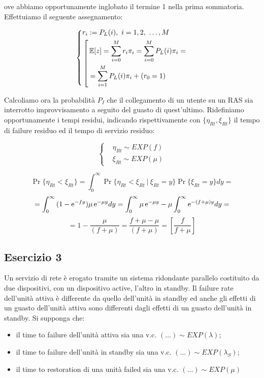 ove abbiamo opportunamente inglobato il termine 1 nella prima sommatoria. Effettuiamo il seguente assegnamento:

\[
	\left\{
	\begin{aligned}
	&r_i := P_L(i),\ i=1,2,\ \dots,M\\
	&\left[
	\begin{aligned}
	&\operatorname{\mathbb{E}}[z] = \sum_{i=0}^M{r_i\pi_i} = \sum_{i=0}^M{P_L(i)\pi_i} =\\
	&= \sum_{i=1}^M{P_L(i)\pi_i} + (r_0=1)
	\end{aligned}
	\right.
	\end{aligned}
	\right.
\]

Calcoliamo ora la probabilità $P_I$ che il collegamento di un utente su un RAS sia interrotto improvvisamento a seguito del guasto di quest'ultimo. Ridefiniamo opportunamente i tempi residui, indicando rispettivamente con $\{\eta_{Rt},\xi_{Rt}\}$ il tempo di failure residuo ed il tempo di servizio residuo:

\[
	\left\{
	\begin{aligned}
	&\eta_{Rt}\sim EXP(f)\\
	&\xi_{Rt}\sim EXP(\mu)
	\end{aligned}
	\right.
\]

\[
	\Pr\{\eta_{Rt}<\xi_{Rt}\} = \int_0^\infty{\Pr\{\eta_{Rt}<\xi_{Rt}\ |\ \xi_{Rt}=y\}\Pr\{\xi_{Rt}=y\}dy} =
\]
\[
	= \int_0^\infty{(1-\mathop{}\!\mathrm{e}^{-fy})\mu\mathop{}\!\mathrm{e}^{-\mu y}dy} = \int_0^\infty{\mu\mathop{}\!\mathrm{e}^{-\mu y}}-\mu\int_0^\infty{\mathop{}\!\mathrm{e}^{-(f+\mu)y}dy} =
\]
\[
	= 1-\frac{\mu}{(f+\mu)} = \frac{f+\mu-\mu}{(f+\mu)} = [\frac{f}{f+\mu}]
\]
	

\subsection{Esercizio 3}

Un servizio di rete è erogato tramite un sistema ridondante parallelo costituito da due dispositivi, con un dispositivo active, l’altro in standby. Il failure rate dell’unità attiva è differente da quello dell’unità in standby ed anche gli effetti di un guasto dell’unità attiva sono differenti dagli effetti di un guasto dell’unità in standby. Si supponga che:

\begin{itemize}

\item il time to failure dell’unità attiva sia una v.c. $(\dots)\sim EXP(\lambda)$;
\item il time to failure dell’unità in standby sia una v.c. $(\dots)\sim EXP(\lambda_S)$;
\item il time to restoration di una unità failed sia una v.c. $(\dots)\sim EXP(\mu)$
\end{itemize}
 

